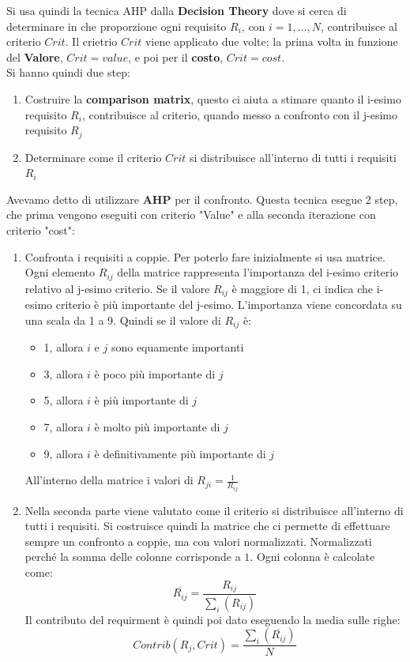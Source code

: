 Si usa quindi la tecnica AHP dalla \textbf{Decision Theory} dove si cerca di determinare in che proporzione ogni requisito $R_i$, con $i = 1, \dots, N$, contribuisce al criterio $Crit$. Il crietrio $Crit$ viene applicato due volte; la prima volta in funzione del \textbf{Valore}, $Crit=value$, e poi per il \textbf{costo}, $Crit=cost$.\\
Si hanno quindi due step:
\begin{enumerate}
  \item Costruire la \textbf{comparison matrix}, questo ci aiuta a stimare quanto il i-esimo requisito $R_i$, contribuisce al criterio, quando messo a confronto con il j-esimo requisito $R_j$
  \item Determinare come il criterio $Crit$ si distribuisce all'interno di tutti i requisiti $R_i$
\end{enumerate} 

Avevamo detto di utilizzare \textbf{AHP} per il confronto. Questa tecnica esegue 2 step, che prima vengono eseguiti con criterio "Value" e alla seconda iterazione con criterio "cost":
\begin{enumerate}
    \item Confronta i requisiti a coppie. Per poterlo fare inizialmente si usa matrice. Ogni elemento $R_{ij}$ della matrice rappresenta l'importanza del i-esimo criterio relativo al j-esimo criterio. Se il valore $R_{ij}$ è maggiore di 1, ci indica che i-esimo criterio è più importante del j-esimo. L'importanza viene concordata su una scala da 1 a 9. Quindi se il valore di $R_{ij}$ è: 
        \begin{itemize}
            \item 1, allora $i$ e $j$ sono equamente importanti
            \item 3, allora $i$ è poco più importante di $j$
            \item 5, allora $i$ è più importante di $j$
            \item 7, allora $i$ è molto più importante di $j$
            \item 9, allora $i$ è definitivamente più importante di $j$
        \end{itemize}
        All'interno della matrice i valori di $R_{ji} =\displaystyle \frac{1}{R_{ij}}$
    \item Nella seconda parte viene valutato come il criterio si distribuisce all'interno di tutti i requisiti. Si costruisce quindi la matrice che ci permette di effettuare sempre un confronto a coppie, ma con valori normalizzati. Normalizzati perché la somma delle colonne corrisponde a $1$. Ogni colonna è calcolate come: $$\overline{R_{ij}} = \displaystyle\frac{R_{ij}}{\sum_i(R_{ij})}$$ Il contributo del requirment è quindi poi dato eseguendo la media sulle righe:
    $$Contrib(R_j, Crit) = \frac{\sum_i(\overline{R_{ij}})}{N}$$
\end{enumerate}